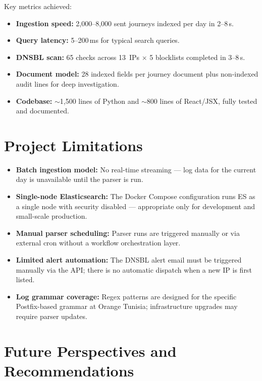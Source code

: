 \documentclass[12pt,a4paper,oneside]{report}
\begin{document}
Key metrics achieved:
\begin{itemize}
  \item \textbf{Ingestion speed:} 2,000--8,000 sent journeys indexed per day in 2--8\,s.
  \item \textbf{Query latency:} 5--200\,ms for typical search queries.
  \item \textbf{DNSBL scan:} 65 checks across 13~IPs $\times$ 5 blocklists completed in 3--8\,s.
  \item \textbf{Document model:} 28 indexed fields per journey document plus non-indexed audit lines for deep investigation.
  \item \textbf{Codebase:} $\sim$1,500 lines of Python and $\sim$800 lines of React/JSX, fully tested and documented.
\end{itemize}

\section*{Project Limitations}
{}

\begin{itemize}
  \item \textbf{Batch ingestion model:} No real-time streaming --- log data for the current day is unavailable until the parser is run.
  \item \textbf{Single-node Elasticsearch:} The Docker Compose configuration runs ES as a single node with security disabled --- appropriate only for development and small-scale production.
  \item \textbf{Manual parser scheduling:} Parser runs are triggered manually or via external cron without a workflow orchestration layer.
  \item \textbf{Limited alert automation:} The DNSBL alert email must be triggered manually via the API; there is no automatic dispatch when a new IP is first listed.
  \item \textbf{Log grammar coverage:} Regex patterns are designed for the specific Postfix-based grammar at Orange Tunisia; infrastructure upgrades may require parser updates.
\end{itemize}

\section*{Future Perspectives and Recommendations}
{}
\end{document}
